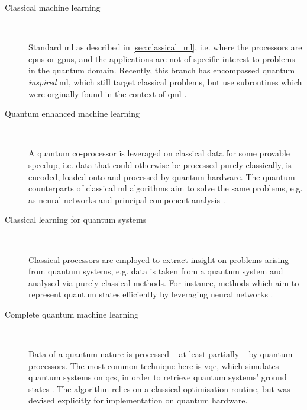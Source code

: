 \begin{description}\label{description:qml}
    \item[Classical machine learning] \ 

        Standard \gls{ml} as described in \cref{sec:classical_ml}, i.e. where the processors are \glspl{cpu} or \glspl{gpu}, 
            and the applications are not of specific interest to problems in the quantum domain. 
        Recently, this branch has encompassed quantum \emph{inspired} \gls{ml}, which still target classical problems, 
            but use subroutines which were orginally found in the context of \gls{qml} \cite{tang2019quantum}.

    \item[Quantum enhanced machine learning] \
    
        A quantum co-processor is leveraged on classical data for some provable speedup,
        i.e. data that could otherwise be processed purely classically, is encoded, loaded onto and processed by quantum hardware.
        The quantum counterparts of classical \gls{ml} algorithms aim to solve the same problems, 
            e.g. as neural networks \cite{schuld2014quest, cao2017quantum} and principal component analysis \cite{lloyd2014quantum}. 

    \item[Classical learning for quantum systems] \ 
    
        Classical processors are employed to extract insight on problems arising from quantum systems, 
            e.g. data is taken from a quantum system and analysed via purely classical methods.
            For instance, methods which aim to represent quantum states efficiently by leveraging 
            neural networks \cite{carleo2017solving, torlai2018neural}. 

    \item[Complete quantum machine learning] \ 

        Data of a quantum nature is processed -- at least partially -- by quantum processors. 
        The most common technique here is \gls{vqe}, which simulates quantum systems on \glspl{qc}, 
        in order to retrieve quantum systems' ground states \cite{peruzzo2014variational}.
        The algorithm relies on a classical optimisation routine, but was devised explicitly for implementation on quantum hardware. 
\end{description}
